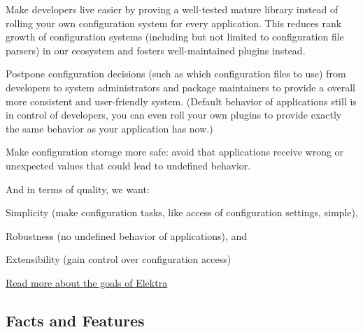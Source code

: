 \begin{DoxyItemize}
\item Make developers live easier by proving a well-\/tested mature library instead of rolling your own configuration system for every application. This reduces rank growth of configuration systems (including but not limited to configuration file parsers) in our ecosystem and fosters well-\/maintained plugins instead.
\item Postpone configuration decisions (such as which configuration files to use) from developers to system administrators and package maintainers to provide a overall more consistent and user-\/friendly system. (Default behavior of applications still is in control of developers, you can even roll your own plugins to provide exactly the same behavior as your application has now.)
\item Make configuration storage more safe\+: avoid that applications receive wrong or unexpected values that could lead to undefined behavior.
\end{DoxyItemize}

And in terms of quality, we want\+:


\begin{DoxyEnumerate}
\item Simplicity (make configuration tasks, like access of configuration settings, simple),
\item Robustness (no undefined behavior of applications), and
\item Extensibility (gain control over configuration access)
\end{DoxyEnumerate}

\hyperlink{doc_GOALS_md}{Read more about the goals of Elektra}

\subsection*{Facts and Features}


